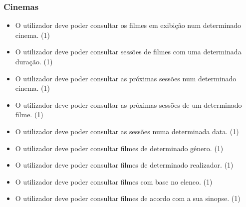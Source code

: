 \documentclass[11pt,a4paper]{article}
\newcommand{\requirement}[3]{
    #1 (#3)
}
\begin{document}
\begin{appendices}
\subsubsection{Cinemas}
\begin{itemize}
    \setlength\itemsep{0em}
    \item \requirement{O utilizador deve poder consultar os filmes em exibição num determinado 
    cinema.}{A consulta dos filmes em exibição num determinado cinema permite aos utilizadores
    restringir a sua consulta a cinemas localizados convenientes.}{1}
    \item \requirement{O utilizador deve poder consultar sessões de filmes com uma determinada duração.}
    {Utilizadores com restrições de tempo podem beneficiar de consultas de filmes com durações que lhes
    permitam visualizar o mesmo.}{1}
    \item \requirement{O utilizador deve poder consultar as próximas sessões num determinado cinema.}{A consulta
    das próximas sessões num determinado cinema permite ao utilizador escolher a sessão que pretende frequentar.}{1}
    \item \requirement{O utilizador deve poder consultar as próximas sessões de um determinado filme.}{A consulta
    das próximas de um determinado filme permite ao utilizador encontrar sessões que sejam do seu interesse.}{1}
    \item \requirement{O utilizador deve poder consultar as sessões numa determinada data.}{A consulta
    das sessões numa determinada data permite ao utilizador escolher a sessão que pretende frequentar
    consoante a sua disponibilidade.}{1}
    \item \requirement{O utilizador deve poder consultar filmes de determinado género.}{A consulta de filmes
    com base no género permite aos utilizadores adaptar as suas escolhas às suas preferências.}{1}
    \item \requirement{O utilizador deve poder consultar filmes de determinado realizador.}{A consulta de filmes
    com base no realizador permite aos utilizadores adaptar as suas escolhas às suas preferências.}{1}
    \item \requirement{O utilizador deve poder consultar filmes com base no elenco.}{A consulta de filmes
    com base no elenco permite aos utilizadores adaptar as suas escolhas às suas preferências.}{1}
    \item \requirement{O utilizador deve poder consultar filmes de acordo com a sua sinopse.}{A consulta de filmes
    com base na sinopse permite aos utilizadores adaptar as suas escolhas às suas preferências.}{1}

\end{itemize}
\end{appendices}
\end{document}
